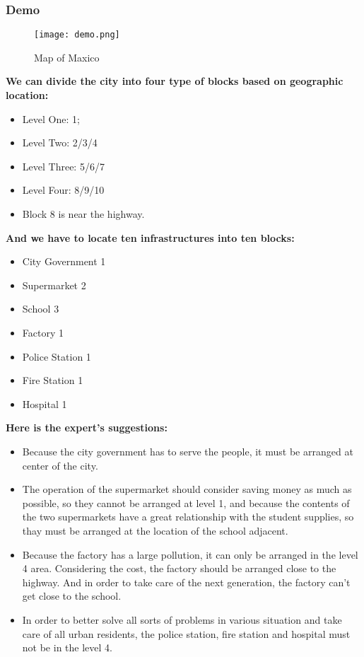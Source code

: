 \documentclass{mcmthesis}
\begin{document}
		\subsubsection{Demo}
		
			\begin{figure}[h]
				\small
				\centering
				\texttt{[image: demo.png]}
				\caption{Map of Maxico} \label{fig:demo}
			\end{figure}
			
			\textbf{We can divide the city into four type of blocks based on geographic location:}
			
			\begin{itemize}
				\item Level One: 1; 
				\item Level Two: 2/3/4
				\item Level Three: 5/6/7
				\item Level Four: 8/9/10
				\item Block 8 is near the highway.
			\end{itemize}
		
			\textbf{And we have to locate ten infrastructures into ten blocks:}
			
			\begin{itemize}
				\item City Government 1
				\item Supermarket 2
				\item School 3
				\item Factory 1
				\item Police Station 1
				\item Fire Station 1
				\item Hospital 1
			\end{itemize}
		
			\textbf{Here is the expert's suggestions:}
		
			\begin{itemize}
				\item Because the city government has to serve the people, it must be arranged at center of the city.
				
				\item The operation of the supermarket should consider saving money as much as possible, so they cannot be arranged at level 1, and because the contents of the two supermarkets have a great relationship with the student supplies, so thay must be arranged at the location of the school adjacent.
				
				\item Because the factory has a large pollution, it can only be arranged in the level 4 area. Considering the cost, the factory should be arranged close to the highway. And in order to take care of the next generation, the factory can't get close to the school.
				
				\item In order to better solve all sorts of problems in various situation and take care of all urban residents, the police station, fire station and hospital must not be in the level 4.
				
			\end{itemize}
			
\end{document}
